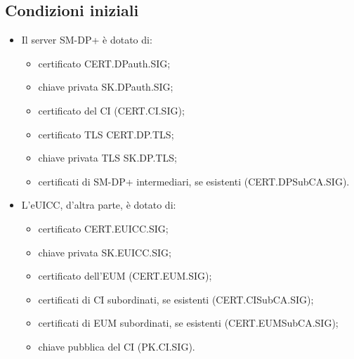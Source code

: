 \documentclass[10pt, twoside, openany]{book}
\begin{document}
\subsection{Condizioni iniziali}
\begin{itemize}
\item Il server SM-DP+ è dotato di:
\begin{itemize}[itemsep=0pt]
\item certificato CERT.DPauth.SIG;
\item chiave privata SK.DPauth.SIG;
\item certificato del CI (CERT.CI.SIG);
\item certificato TLS CERT.DP.TLS;
\item chiave privata TLS SK.DP.TLS;
\item certificati di SM-DP+ intermediari, se esistenti (CERT.DPSubCA.SIG).
\end{itemize}
\item L'eUICC, d'altra parte, è dotato di:
\begin{itemize}[itemsep=0pt]
\item certificato CERT.EUICC.SIG;
\item chiave privata SK.EUICC.SIG;
\item certificato dell'EUM (CERT.EUM.SIG);
\item certificati di CI subordinati, se esistenti (CERT.CISubCA.SIG);
\item certificati di EUM subordinati, se esistenti (CERT.EUMSubCA.SIG);
\item chiave pubblica del CI (PK.CI.SIG).
\end{itemize}
\end{itemize}
\end{document}
